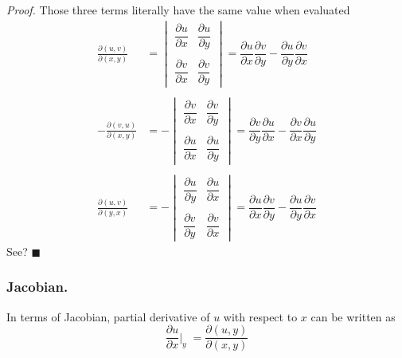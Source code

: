 \documentclass[../../../main.tex]{subfiles}
\begin{document}
\emph{Proof.} Those three terms literally have the same value when evaluated
\begin{align*}
    \frac{\partial (u,v)}{\partial (x,y)}   & =\begin{vmatrix}
                                                   \dfrac{\partial u}{\partial x} & \dfrac{\partial u}{\partial y} \\
                                                   \\
                                                   \dfrac{\partial v}{\partial x} & \dfrac{\partial v}{\partial y}
                                               \end{vmatrix}
    =\dfrac{\partial u}{\partial x} \dfrac{\partial v}{\partial y}-  \dfrac{\partial u}{\partial y} \dfrac{\partial v}{\partial x}
    \\\\
    - \frac{\partial (v,u)}{\partial (x,y)} & =-\begin{vmatrix}
                                                    \dfrac{\partial v}{\partial x} & \dfrac{\partial v}{\partial y} \\
                                                    \\
                                                    \dfrac{\partial u}{\partial x} & \dfrac{\partial u}{\partial y}
                                                \end{vmatrix} =\dfrac{\partial v}{\partial y}\dfrac{\partial u}{\partial x} -\dfrac{\partial v}{\partial x} \dfrac{\partial u}{\partial y}
    \\\\
    \frac{\partial (u,v)}{\partial (y,x)}   & =-\begin{vmatrix}
                                                    \dfrac{\partial u}{\partial y} & \dfrac{\partial u}{\partial x} \\
                                                    \\
                                                    \dfrac{\partial v}{\partial y} & \dfrac{\partial v}{\partial x}
                                                \end{vmatrix}
    =\dfrac{\partial u}{\partial x}\dfrac{\partial v}{\partial y} -\dfrac{\partial u}{\partial y}\dfrac{\partial v}{\partial x}
\end{align*}
See? $\blacksquare$

\subsubsection{Jacobian.} In terms of Jacobian, partial derivative of $u$ with respect to $x$ can be written as
\begin{equation*}
    \frac{\partial u}{\partial x}\bigg|_y\;=\frac{\partial (u,y)}{\partial (x,y)}
\end{equation*}
\end{document}
